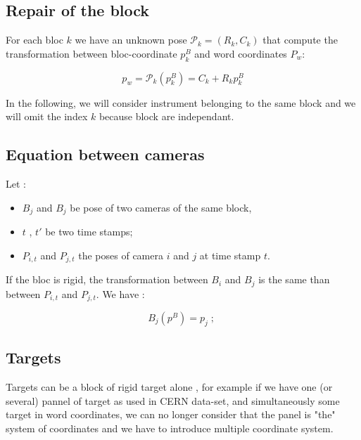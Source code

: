 \subsection{Repair of the block}

For each bloc $k$ we have an unknown pose  $\mathcal{P}_k=(R_k,C_k)$
that compute the transformation between bloc-coordinate $p^B_k$
and word coordinates $P_w$:

\begin{equation}
    p_w =  \mathcal{P}_k(p^B_k) =  C_k + R_k   p^B_k
\end{equation}

In the following, we will consider instrument belonging to the
same block and we will omit the index $k$ because
block are independant.

\subsection{Equation between cameras}

Let  :

\begin{itemize}
    \item $B_j$ and $B_j$ be pose of two cameras of the same block,
    \item $t$ , $t'$ be two time stamps;
    \item $P_{i,t}$ and $P_{j,t}$  the poses of camera
	    $i$ and $j$ at time stamp $t$.
\end{itemize}

If the bloc is rigid, the transformation between $B_i$ and $B_j$ 
is the same than between $P_{i,t}$ and $P_{j,t}$. We have :

\begin{equation}
    B_j (p^B) =  p_j  \; ; \;
\end{equation}


\subsection{Targets}

Targets can be a block of rigid target  alone , for example
if we have one (or several) pannel of target as used in CERN data-set, and simultaneously 
some target in word coordinates, we can no longer  consider that the panel is "the" system
of coordinates and we have to introduce multiple coordinate system.

